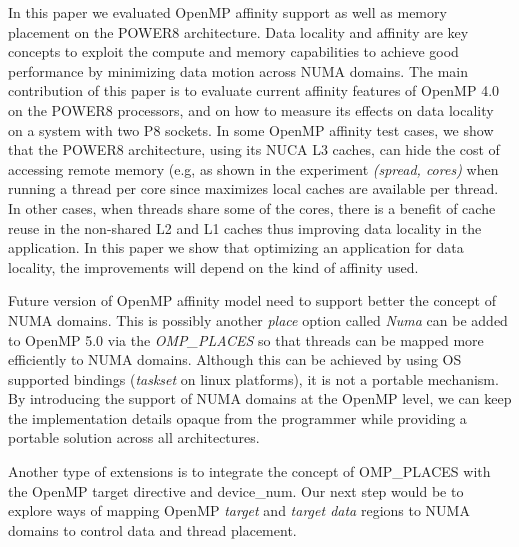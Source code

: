In this paper we evaluated OpenMP affinity support as well as memory placement on the POWER8 architecture. 
Data locality and affinity are key concepts to exploit the compute and memory capabilities to achieve good performance by minimizing data motion across NUMA domains. 
The main contribution of this paper is to evaluate current affinity features of OpenMP 4.0 on the POWER8 processors, and on how to measure its effects on data locality on a system with two P8 sockets. 
In some OpenMP affinity test cases, we show that the POWER8 architecture, using its NUCA L3 caches, can hide the cost of accessing remote memory (e.g, as shown in the experiment \textit{(spread, cores)} when running a thread per core since maximizes local caches are available per thread. 
In other cases, when threads share some of the cores, there is a benefit of cache reuse in the non-shared L2 and L1 caches thus improving data locality in the application.
 In this paper we show that optimizing an application for data locality, the improvements will depend on the kind of affinity used. 

Future version of OpenMP affinity model need to support better the concept of NUMA domains. 
This is possibly another \textit{place} option called \textit{Numa} can be added to OpenMP 5.0 via the \emph{OMP\_PLACES} so that threads can be mapped more efficiently to NUMA domains. Although this can be achieved by using OS supported bindings (\textit{taskset} on linux platforms), it is not a portable mechanism. By introducing the support of NUMA domains at the OpenMP level, we can keep the implementation details opaque from the programmer while providing a portable solution across all architectures.


Another type of extensions is to integrate the concept of OMP\_PLACES with the OpenMP target directive and device\_num. Our next step would be to explore ways of mapping OpenMP \emph{target} and \emph{target data} 
regions to NUMA domains to control data and thread placement.
